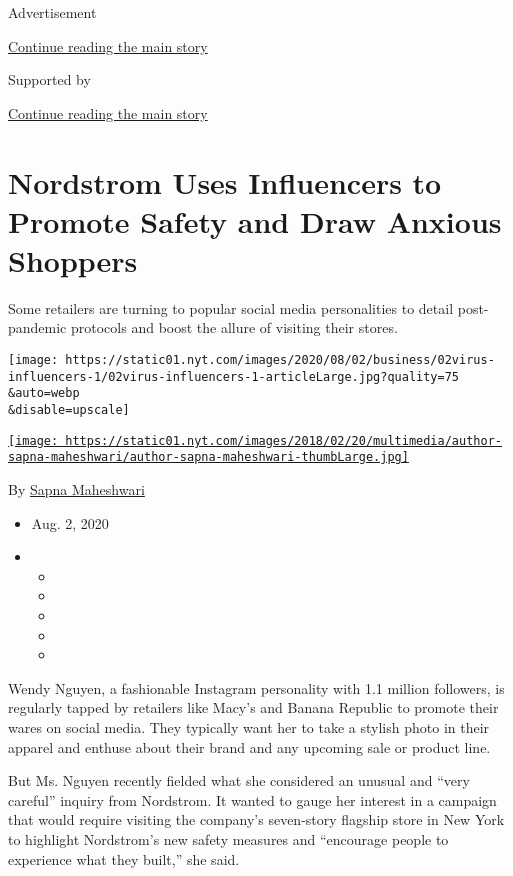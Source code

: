 Advertisement

\protect\hyperlink{after-top}{Continue reading the main story}

Supported by

\protect\hyperlink{after-sponsor}{Continue reading the main story}

\hypertarget{nordstrom-uses-influencers-to-promote-safety-and-draw-anxious-shoppers}{%
\section{Nordstrom Uses Influencers to Promote Safety and Draw Anxious
Shoppers}\label{nordstrom-uses-influencers-to-promote-safety-and-draw-anxious-shoppers}}

Some retailers are turning to popular social media personalities to
detail post-pandemic protocols and boost the allure of visiting their
stores.

\texttt{[image: https://static01.nyt.com/images/2020/08/02/business/02virus-influencers-1/02virus-influencers-1-articleLarge.jpg?quality=75\\\&auto=webp\\\&disable=upscale]}

\href{https://www.nytimes.com/by/sapna-maheshwari}{\texttt{[image: https://static01.nyt.com/images/2018/02/20/multimedia/author-sapna-maheshwari/author-sapna-maheshwari-thumbLarge.jpg]}}

By \href{https://www.nytimes.com/by/sapna-maheshwari}{Sapna Maheshwari}

\begin{itemize}
\item
  Aug. 2, 2020
\item
  \begin{itemize}
  \item
  \item
  \item
  \item
  \item
  \end{itemize}
\end{itemize}

Wendy Nguyen, a fashionable Instagram personality with 1.1 million
followers, is regularly tapped by retailers like Macy's and Banana
Republic to promote their wares on social media. They typically want her
to take a stylish photo in their apparel and enthuse about their brand
and any upcoming sale or product line.

But Ms. Nguyen recently fielded what she considered an unusual and
``very careful'' inquiry from Nordstrom. It wanted to gauge her interest
in a campaign that would require visiting the company's seven-story
flagship store in New York to highlight Nordstrom's new safety measures
and ``encourage people to experience what they built,'' she said.

